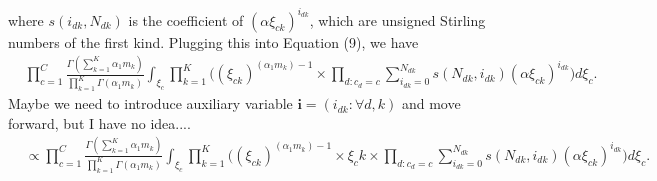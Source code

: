 \documentclass[12pt]{article}
\begin{document}
where $s(i_{dk}, N_{dk})$ is the coefficient of $(\alpha\xi_{ck})^{i_{dk}}$, which are unsigned Stirling numbers of the first kind. Plugging this into Equation (9), we have
\begin{equation}
\begin{aligned}
& \prod_{c=1}^C\frac{\Gamma(\sum_{k=1}^K \alpha_1 m_{k})}{\prod_{k=1}^K\Gamma(\alpha_1 m_{k})}\int_{{\xi}_c} \prod_{k=1}^K \Big((\xi_{ck})^{(\alpha_1 m_k)-1} \times  \prod_{d:c_d = c} \sum_{i_{dk}=0}^{N_{dk}} s(N_{dk}, i_{dk}) (\alpha\xi_{ck})^{i_{dk}}\Big) d\xi_c.
\end{aligned}
\end{equation}
Maybe we need to introduce auxiliary variable $\boldsymbol{i} = (i_{dk}: \forall d, k)$ and move forward, but I have no idea....
\begin{equation}
	\begin{aligned}
		& \propto \prod_{c=1}^C\frac{\Gamma(\sum_{k=1}^K \alpha_1 m_{k})}{\prod_{k=1}^K\Gamma(\alpha_1 m_{k})}\int_{{\xi}_c} \prod_{k=1}^K \Big((\xi_{ck})^{(\alpha_1 m_k)-1} 
	\times \xi_ck	\times  \prod_{d:c_d = c} \sum_{i_{dk}=0}^{N_{dk}} s(N_{dk}, i_{dk}) (\alpha\xi_{ck})^{i_{dk}}\Big) d\xi_c.
	\end{aligned}
\end{equation}
\end{document}
